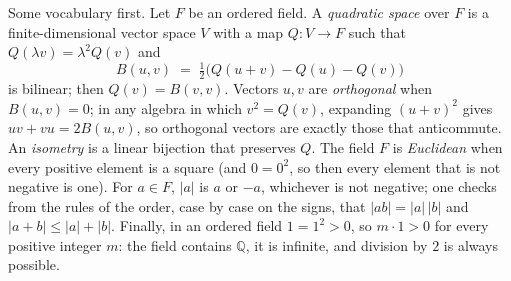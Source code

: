 \documentclass[11pt]{article}
\theoremstyle{definition}
\theoremstyle{plain}
\providecommand{\Q}{}\renewcommand{\Q}{\mathbb{Q}}
\begin{document}
Some vocabulary first. Let $F$ be an ordered field. A \emph{quadratic space} over $F$ is a finite-dimensional vector space $V$ with a map $Q : V \to F$ such that $Q(\lambda v) = \lambda^{2}Q(v)$ and
\[
B(u, v) \;=\; \tfrac12\bigl(Q(u + v) - Q(u) - Q(v)\bigr)
\]
is bilinear; then $Q(v) = B(v, v)$. Vectors $u, v$ are \emph{orthogonal} when $B(u,v) = 0$; in any algebra in which $v^{2} = Q(v)$, expanding $(u+v)^{2}$ gives $uv + vu = 2B(u,v)$, so orthogonal vectors are exactly those that anticommute. An \emph{isometry} is a linear bijection that preserves $Q$. The field $F$ is \emph{Euclidean} when every positive element is a square (and $0 = 0^{2}$, so then every element that is not negative is one). For $a \in F$, $|a|$ is $a$ or $-a$, whichever is not negative; one checks from the rules of the order, case by case on the signs, that $|ab| = |a|\,|b|$ and $|a + b| \leq |a| + |b|$. Finally, in an ordered field $1 = 1^{2} > 0$, so $m \cdot 1 > 0$ for every positive integer $m$: the field contains $\Q$, it is infinite, and division by $2$ is always possible.
\end{document}
